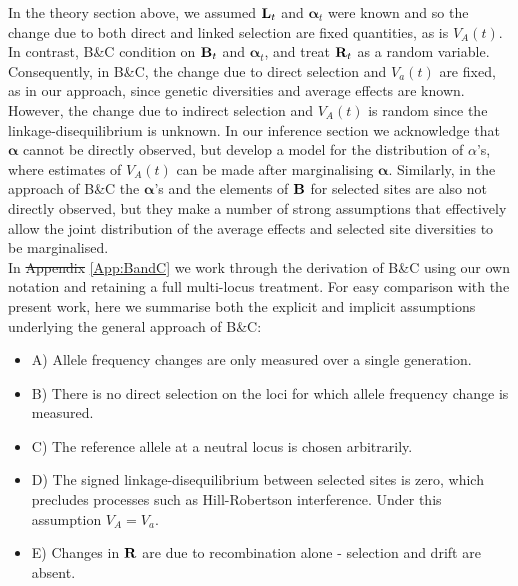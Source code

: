 \documentclass[12pt]{article}
\makeatletter
\providecommand{\DIFaddtex}[1]{{\protect\color{blue}\uwave{#1}}} %
\providecommand{\DIFdeltex}[1]{{\protect\color{red}\sout{#1}}} %
\providecommand{\DIFaddbegin}{} %
\providecommand{\DIFaddend}{} %
\providecommand{\DIFdelbegin}{} %
\providecommand{\DIFdelend}{} %
\providecommand{\DIFadd}[1]{\texorpdfstring{\DIFaddtex{#1}}{#1}} %
\providecommand{\DIFdel}[1]{\texorpdfstring{\DIFdeltex{#1}}{}} %
\newcommand{\DIFscaledelfig}{0.5}
\newlength{\DIFdelgraphicswidth} %
\newlength{\DIFdelgraphicsheight} %
\newcommand{\DIFaddincludegraphics}[2][]{{\color{blue}\fbox{\DIFOincludegraphics[#1]{#2}}}} %
\newcommand{\DIFdelincludegraphics}[2][]{%
\sbox{\DIFdelgraphicsbox}{\DIFOincludegraphics[#1]{#2}}%
\settoboxwidth{\DIFdelgraphicswidth}{\DIFdelgraphicsbox} %
\settoboxtotalheight{\DIFdelgraphicsheight}{\DIFdelgraphicsbox} %
\scalebox{\DIFscaledelfig}{%
\parbox[b]{\DIFdelgraphicswidth}{\usebox{\DIFdelgraphicsbox}\\[-\baselineskip] \rule{\DIFdelgraphicswidth}{0em}}\llap{\resizebox{\DIFdelgraphicswidth}{\DIFdelgraphicsheight}{%
\setlength{\unitlength}{\DIFdelgraphicswidth}%
\begin{picture}(1,1)%
\thicklines\linethickness{2pt} %
{\color[rgb]{1,0,0}\put(0,0){\framebox(1,1){}}}%
{\color[rgb]{1,0,0}\put(0,0){\line( 1,1){1}}}%
{\color[rgb]{1,0,0}\put(0,1){\line(1,-1){1}}}%
\end{picture}%
}\hspace*{3pt}}} %
} %
\DeclareRobustCommand{\DIFaddbegin}{\DIFOaddbegin \let\includegraphics\DIFaddincludegraphics} %
\DeclareRobustCommand{\DIFaddend}{\DIFOaddend \let\includegraphics\DIFOincludegraphics} %
\DeclareRobustCommand{\DIFdelbegin}{\DIFOdelbegin \let\includegraphics\DIFdelincludegraphics} %
\DeclareRobustCommand{\DIFdelend}{\DIFOaddend \let\includegraphics\DIFOincludegraphics} %
\let\sout@orig\sout %
\renewcommand{\sout}[1]{\ifmmode\text{\sout@orig{\ensuremath{#1}}}\else\sout@orig{#1}\fi} %
\makeatother
\begin{document}
\begin{bibunit}
In the theory section above, we assumed ${\bf L}_t$ and $\boldsymbol{\alpha}_t$ were known and so the change due to both direct and linked selection are fixed quantities, as is $V_A(t)$. In contrast, B\&C condition on ${\bf B}_t$ and $\boldsymbol{\alpha}_t$, and treat ${\bf R}_t$ as a random variable. Consequently, in B\&C, the change due to direct selection and $V_a(t)$ are fixed, as in our approach, since genetic diversities and average effects are known. However, the change due to indirect selection and $V_A(t)$ is random since the linkage-disequilibrium is unknown.  In our inference section we acknowledge that $\boldsymbol{\alpha}$ cannot be directly observed, but develop a model for the distribution of $\alpha$'s, where estimates of $V_A(t)$ can be made after marginalising $\boldsymbol{\alpha}$. Similarly, in the approach of B\&C the $\boldsymbol{\alpha}$'s and the elements of ${\bf B}$ for selected sites are also not directly observed, but they make a number of strong assumptions that effectively allow the joint distribution of the average effects and selected site diversities to be marginalised.\\

In \DIFdelbegin \DIFdel{Appendix }\DIFdelend \DIFaddbegin \DIFadd{Supplementary information }\DIFaddend \ref{App:BandC} we work through the derivation of B\&C using our own notation and retaining a full multi-locus treatment. For easy comparison with the present work, here we summarise both the explicit and implicit  assumptions underlying the general approach of B\&C:

\begin{itemize}

\item A) Allele frequency changes are only measured over a single generation.

\item B) There is no direct selection on the loci for which allele frequency change is measured.

\item C) The reference allele at a neutral locus is chosen arbitrarily.

\item D) The signed linkage-disequilibrium between selected sites is zero, which precludes processes such as Hill-Robertson interference. Under this assumption $V_A=V_a$.

\item E) Changes in ${\bf R}$ are due to recombination alone - selection and drift are absent. 


\end{itemize}
\end{bibunit}
\end{document}
